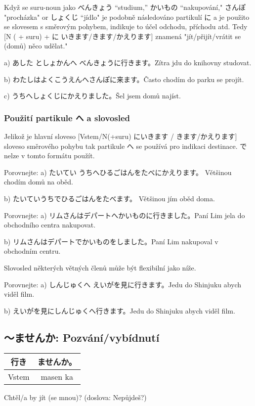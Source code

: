 Když se suru-noun jako べんきょう “studium,” かいもの “nakupování,"
さんぽ "procházka" or しょくじ “jídlo" je podobně následováno partikulí  に a je použito se slovesem s směrovým pohybem, indikuje to účel odchodu, příchodu atd. Tedy
[N ( + suru) + に いきます/きます/かえります] znamená "jít/přijít/vrátit se (domů) něco udělat."

a) あした としょかんへ べんきょうに行きます。Zítra jdu do knihovny studovat.

b) わたしはよくこうえんへさんぽに来ます。Často chodím do parku se projít.

c) うちへしょくじにかえりました。Šel jsem domů najíst.

\subsubsection{ Použití partikule  へ a slovosled}
Jelikož je hlavní sloveso [Vstem/N(+suru) にいきます / きます/かえります]  sloveso směrového pohybu tak partikule へ se používá pro indikaci destinace. で nelze v tomto formátu použít.

Porovnejte:
a) たいてい うちへひるごはんをたべにかえります。 Většinou chodím domů na oběd.

b) たいていうちでひるごはんをたべます。 Většinou jím oběd doma.



Porovnejte:
a) リムさんはデパートへかいものに行きました。Paní Lim jela do obchodního centra nakupovat.

b) リムさんはデパートでかいものをしました。Paní Lim nakupoval v obchodním centru.

Slovosled některých větných členů může být flexibilní jako níže.

Porovnejte:
a) しんじゅくへ えいがを見に行きます。Jedu do Shinjuku abych viděl film.

b) えいがを見にしんじゅくへ行きます。Jedu do Shinjuku abych viděl film.

\subsection{〜ませんか: Pozvání/vybídnutí}
\begin{center}
\begin{tabular}{||c|c||}
\hline
行き&ませんか。\\
\hline
Vstem&masen ka\\
\hline
\end{tabular}
\end{center}
Chtěl/a by jít (se mnou)? (doslova: Nepůjdeš?)


